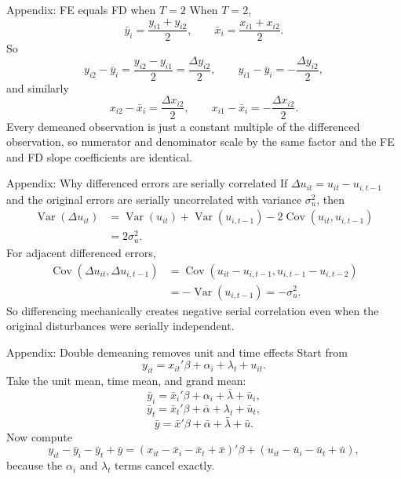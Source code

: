 \documentclass[10pt]{beamer}
\DeclareMathOperator{\Cov}{Cov}
\DeclareMathOperator{\Var}{Var}
\begin{document}
\begin{frame}{Appendix: FE equals FD when $T=2$}
\label{app:fe_fd_t2}
\small
When $T=2$,
\[
\bar{y}_i = \frac{y_{i1}+y_{i2}}{2},
\qquad
\bar{x}_i = \frac{x_{i1}+x_{i2}}{2}.
\]
So
\[
y_{i2}-\bar{y}_i = \frac{y_{i2}-y_{i1}}{2} = \frac{\Delta y_{i2}}{2},
\qquad
y_{i1}-\bar{y}_i = -\frac{\Delta y_{i2}}{2},
\]
and similarly
\[
x_{i2}-\bar{x}_i = \frac{\Delta x_{i2}}{2},
\qquad
x_{i1}-\bar{x}_i = -\frac{\Delta x_{i2}}{2}.
\]
Every demeaned observation is just a constant multiple of the differenced observation, so numerator and denominator scale by the same factor and the FE and FD slope coefficients are identical.
\hfill\hyperlink{slide:fevfd}{}
\end{frame}

\begin{frame}{Appendix: Why differenced errors are serially correlated}
\label{app:fdserialproof}
\small
If $\Delta u_{it} = u_{it} - u_{i,t-1}$ and the original errors are serially uncorrelated with variance $\sigma_u^2$, then
\begin{align*}
\Var(\Delta u_{it})
&= \Var(u_{it}) + \Var(u_{i,t-1}) - 2\Cov(u_{it},u_{i,t-1}) \\
&= 2\sigma_u^2.
\end{align*}
For adjacent differenced errors,
\begin{align*}
\Cov(\Delta u_{it}, \Delta u_{i,t-1})
&= \Cov(u_{it}-u_{i,t-1}, u_{i,t-1}-u_{i,t-2}) \\
&= -\Var(u_{i,t-1}) = -\sigma_u^2.
\end{align*}
So differencing mechanically creates negative serial correlation even when the original disturbances were serially independent.
\hfill\hyperlink{slide:fdserial}{}
\end{frame}

\begin{frame}{Appendix: Double demeaning removes unit and time effects}
\label{app:twfeproof}
\small
Start from
\[
y_{it} = x_{it}'\beta + \alpha_i + \lambda_t + u_{it}.
\]
Take the unit mean, time mean, and grand mean:
\[
\bar{y}_i = \bar{x}_i'\beta + \alpha_i + \bar{\lambda} + \bar{u}_i,
\]
\[
\bar{y}_t = \bar{x}_t'\beta + \bar{\alpha} + \lambda_t + \bar{u}_t,
\]
\[
\bar{y} = \bar{x}'\beta + \bar{\alpha} + \bar{\lambda} + \bar{u}.
\]
Now compute
\[
y_{it} - \bar{y}_i - \bar{y}_t + \bar{y}
=
(x_{it} - \bar{x}_i - \bar{x}_t + \bar{x})'\beta
+ (u_{it} - \bar{u}_i - \bar{u}_t + \bar{u}),
\]
because the $\alpha_i$ and $\lambda_t$ terms cancel exactly.
\hfill\hyperlink{slide:double}{}
\end{frame}
\end{document}
